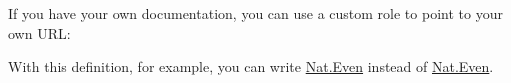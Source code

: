 \documentclass[a4paper]{article}
\begin{document}
If you have your own documentation, you can use a custom role to point to your own URL:

With this definition, for example, you can write \href{https://coq.inria.fr/library/Coq.Arith.PeanoNat.html\#Nat.Even}{Nat.Even} instead of \href{https://coq.inria.fr/library/Coq.Arith.PeanoNat.html\#Nat.Even}{Nat.Even}.
\end{document}
